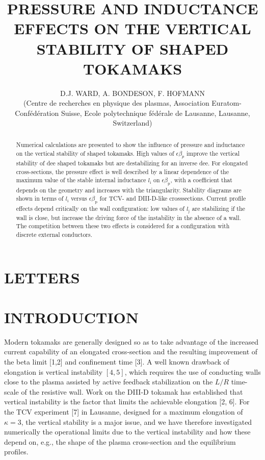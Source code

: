 \documentclass[10pt]{article}
\title{PRESSURE AND INDUCTANCE EFFECTS ON THE VERTICAL STABILITY OF SHAPED TOKAMAKS }
\author{D.J. WARD, A. BONDESON, F. HOFMANN\\
(Centre de recherches en physique des plasmas, Association Euratom-Confédération Suisse, Ecole polytechnique fédérale de Lausanne, Lausanne, Switzerland)}
\date{}
\begin{document}
\maketitle
\section{LETTERS}


\begin{abstract}
Numerical calculations are presented to show the influence of pressure and inductance on the vertical stability of shaped tokamaks. High values of $\epsilon \beta_{p}$ improve the vertical stability of dee shaped tokamaks but are destabilizing for an inverse dee. For elongated cross-sections, the pressure effect is well described by a linear dependence of the maximum value of the stable internal inductance $l_{\mathrm{i}}$ on $\epsilon \beta_{\mathrm{p}}$, with a coefficient that depends on the geometry and increases with the triangularity. Stability diagrams are shown in terms of $l_{\mathrm{i}}$ versus $\epsilon \beta_{\mathrm{p}}$ for TCV- and DIII-D-like crosssections. Current profile effects depend critically on the wall configuration: low values of $l_{\mathrm{j}}$ are stabilizing if the wall is close, but increase the driving force of the instability in the absence of a wall. The competition between these two effects is considered for a configuration with discrete external conductors.
\end{abstract}

\section{INTRODUCTION}
Modern tokamaks are generally designed so as to take advantage of the increased current capability of an elongated cross-section and the resulting improvement of the beta limit [1,2] and confinement time [3]. A well known drawback of elongation is vertical instability $[4,5]$, which requires the use of conducting walls close to the plasma assisted by active feedback stabilization on the $L / R$ time-scale of the resistive wall. Work on the DIII-D tokamak has established that vertical instability is the factor that limits the achievable elongation [2, 6]. For the TCV experiment [7] in Lausanne, designed for a maximum elongation of $\kappa=3$, the vertical stability is a major issue, and we have therefore investigated numerically the operational limits due to the vertical instability and how these depend on, e.g., the shape of the plasma cross-section and the equilibrium profiles.
\end{document}
